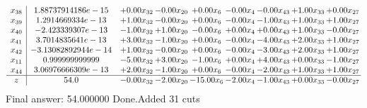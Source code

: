 \documentclass[8pt]{article}
\begin{document}
\[\begin{array}{c| c c@{\hskip 2pt} c@{\hskip 2pt} c@{\hskip 2pt} c@{\hskip 2pt} c@{\hskip 2pt} c@{\hskip 2pt} c@{\hskip 2pt} }
 x_{38}   &  1.88737914186e-15 & +  0.00 x_{32} & -0.00 x_{20} & +  0.00 x_{6} & -0.00 x_{4} & -0.00 x_{43} & +  1.00 x_{33} & +  0.00 x_{27}\\
 x_{39}   &  1.2914669334e-13 & +  1.00 x_{32} & -0.00 x_{20} & +  0.00 x_{6} & -0.00 x_{4} & -1.00 x_{43} & +  1.00 x_{33} & +  1.00 x_{27}\\
 x_{40}   &  -2.423339307e-13 & -1.00 x_{32} & +  1.00 x_{20} & -0.00 x_{6} & +  0.00 x_{4} & +  0.00 x_{43} & +  1.00 x_{33} & -0.00 x_{27}\\
 x_{41}   &  3.7014835641e-13 & +  3.00 x_{32} & -1.00 x_{20} & +  0.00 x_{6} & -0.00 x_{4} & -4.00 x_{43} & +  2.00 x_{33} & +  1.00 x_{27}\\
 x_{42}   &  -3.13082892944e-14 & +  1.00 x_{32} & -0.00 x_{20} & +  0.00 x_{6} & -0.00 x_{4} & -3.00 x_{43} & +  2.00 x_{33} & +  1.00 x_{27}\\
 x_{11}   &  0.999999999999 & -5.00 x_{32} & +  3.00 x_{20} & -1.00 x_{6} & +  0.00 x_{4} & +  4.00 x_{43} & +  0.00 x_{33} & -1.00 x_{27}\\
 x_{44}   &  3.06976666309e-13 & +  2.00 x_{32} & -1.00 x_{20} & +  0.00 x_{6} & -0.00 x_{4} & -2.00 x_{43} & +  1.00 x_{33} & +  1.00 x_{27}\\
\hline
z    &  54.0 & -0.00 x_{32} & -2.00 x_{20} & -15.00 x_{6} & -2.00 x_{4} & -1.00 x_{43} & +  0.00 x_{33} & -0.00 x_{27}\\
\end{array}\]
 Final answer: 54.000000 
Done.Added 31 cuts 
\end{document}
